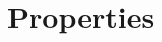 \documentclass[runningheads,a4paper]{llncs}
\newcommand{\yap}[1]{\lstinline[style=yap]{#1}}
\newcommand{\refTabI}[1]{Table~\ref{#1}}
\begin{document}











\section{Properties}
\label{sec:properties}
\end{document}
